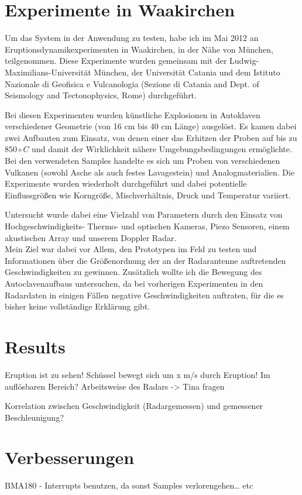 \documentclass[12pt,a4paper]{scrartcl}
\begin{document}
\section{Experimente in Waakirchen}

Um das System in der Anwendung zu testen, habe ich im Mai 2012 an Eruptionsdynamikexperimenten in Waakirchen, in der Nähe von München, teilgenommen. Diese Experimente wurden gemeinsam mit der Ludwig-Maximilians-Universität München, der Universität Catania und dem Istituto Nazionale di Geofisica e Vulcanologia (Sezione di Catania and Dept. of Seismology and Tectonophysics, Rome) durchgeführt. 

Bei diesen Experimenten wurden künstliche Explosionen in Autoklaven \citep{Spieler:2004fk} verschiedener Geometrie (von 16 cm bis 40 cm Länge) ausgelöst. Es kamen dabei zwei Aufbauten zum Einsatz, von denen einer das Erhitzen der Proben auf bis zu $850\circ C$ und damit der Wirklichkeit nähere Umgebungsbedingungen ermöglichte. Bei den verwendeten Samples handelte es sich um Proben von verschiedenen Vulkanen (sowohl Asche als auch festes Lavagestein) und Analogmaterialien.
Die Experimente wurden wiederholt durchgeführt und dabei potentielle Einflussgrößen wie Korngröße, Mischverhältnis, Druck und Temperatur variiert.

Untersucht wurde dabei eine Vielzahl von Parametern durch den Einsatz von Hochgeschwindigkeits- Thermo- und optischen Kameras, Piezo Sensoren, einem akustischen Array und unserem Doppler Radar.\\

Mein Ziel war dabei vor Allem, den Prototypen im Feld zu testen und Informationen über die Größenordnung der an der Radarantenne auftretenden Geschwindigkeiten zu gewinnen. Zusätzlich wollte ich die Bewegung des Autoclavenaufbaus untersuchen, da bei vorherigen Experimenten in den Radardaten in einigen Fällen negative Geschwindigkeiten auftraten, für die es bisher keine vollständige Erklärung gibt. 



\section{Results}

Eruption ist zu sehen!
Schüssel bewegt sich um x m/s durch Eruption! Im auflösbaren Bereich? Arbeitsweise des Radars -> Tina fragen

Korrelation zwischen Geschwindigkeit (Radargemessen) und gemessener Beschleunigung?

\section{Verbesserungen}

BMA180 - Interrupts benutzen, da sonst Samples verlorengehen… etc


\clearpage
\newpage
\singlespacing
\appendix


\end{document}
